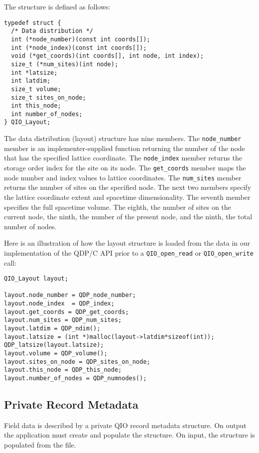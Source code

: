 \documentclass{article}
\begin{document}
The structure is defined as follows:
\begin{verbatim}
typedef struct {
  /* Data distribution */
  int (*node_number)(const int coords[]);
  int (*node_index)(const int coords[]);
  void (*get_coords)(int coords[], int node, int index);
  size_t (*num_sites)(int node);
  int *latsize;
  int latdim;
  size_t volume;
  size_t sites_on_node;
  int this_node;
  int number_of_nodes;
} QIO_Layout;
\end{verbatim}
%
The data distribution (layout) structure has nine members.  The
\verb|node_number| member is an implementer-supplied function
returning the number of the node that has the specified lattice
coordinate.  The \verb|node_index| member returns the storage order
index for the site on its node.  The \verb|get_coords| member maps the
node number and index values to lattice coordinates. The
\verb|num_sites| member returns the number of sites on the specified
node. The next two members specify the lattice coordinate extent and
spacetime dimensionality.  The seventh member specifies the full
spacetime volume.  The eighth, the number of sites on the current
node, the ninth, the number of the present node, and the ninth, the
total number of nodes.

Here is an illustration of how the layout structure is loaded from the
data in our implementation of the QDP/C API prior to a
\verb|QIO_open_read| or \verb|QIO_open_write| call:
%
\begin{verbatim}
QIO_Layout layout;

layout.node_number = QDP_node_number;
layout.node_index  = QDP_index;
layout.get_coords = QDP_get_coords;
layout.num_sites = QDP_num_sites;
layout.latdim = QDP_ndim();
layout.latsize = (int *)malloc(layout->latdim*sizeof(int));
QDP_latsize(layout.latsize);
layout.volume = QDP_volume();
layout.sites_on_node = QDP_sites_on_node;
layout.this_node = QDP_this_node;
layout.number_of_nodes = QDP_numnodes();
\end{verbatim}

\subsection{Private Record Metadata}
\label{sec:recordinfo}

Field data is described by a private QIO record metadata structure.
On output the application must create and populate the structure.  On
input, the structure is populated from the file.
\end{document}

